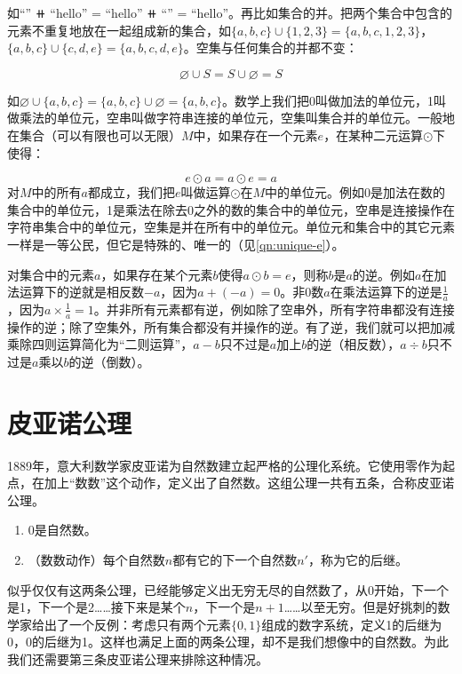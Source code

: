 \documentclass[b5paper]{ctexart}
\begin{document}
如``'' $\doubleplus$ ``hello'' = ``hello'' $\doubleplus$ ``'' = ``hello''。再比如集合的并。把两个集合中包含的元素不重复地放在一起组成新的集合，如$\{a, b, c\} \cup \{1, 2, 3\} = \{a, b, c, 1, 2, 3\}$，$\{a, b, c\} \cup \{c, d, e\} = \{a, b, c, d, e\}$。空集与任何集合的并都不变：

\[
\varnothing \cup S = S \cup \varnothing = S
\]

如$\varnothing \cup \{a, b, c\} = \{a, b, c\} \cup \varnothing = \{a, b, c\}$。数学上我们把0叫做加法的单位元，1叫做乘法的单位元，空串叫做字符串连接的单位元，空集叫集合并的单位元。一般地在集合（可以有限也可以无限）$M$中，如果存在一个元素$e$，在某种二元运算$\odot$下使得：

\[
  e \odot a = a \odot e = a
\]
对$M$中的所有$a$都成立，我们把$e$叫做运算$\odot$在$M$中的单位元。例如0是加法在数的集合中的单位元，1是乘法在除去0之外的数的集合中的单位元，空串是连接操作在字符串集合中的单位元，空集是并在所有中的单位元。单位元和集合中的其它元素一样是一等公民，但它是特殊的、唯一的（见\cref{qn:unique-e}）。

 
对集合中的元素$a$，如果存在某个元素$b$使得$a \odot b = e$，则称$b$是$a$的逆。例如$a$在加法运算下的逆就是相反数$-a$，因为$a + (-a) = 0$。非0数$a$在乘法运算下的逆是$\frac{1}{a}$，因为$a \times \frac{1}{a} = 1$。并非所有元素都有逆，例如除了空串外，所有字符串都没有连接操作的逆；除了空集外，所有集合都没有并操作的逆。有了逆，我们就可以把加减乘除四则运算简化为“二则运算”，$a - b$只不过是$a$加上$b$的逆（相反数），$a \div b$只不过是$a$乘以$b$的逆（倒数）。

\section{皮亚诺公理}
\label{sec:peano-axioms}
1889年，意大利数学家皮亚诺为自然数建立起严格的公理化系统。它使用零作为起点，在加上“数数”这个动作，定义出了自然数。这组公理一共有五条，合称皮亚诺公理。

\begin{enumerate}
\item 0是自然数。
\item （数数动作）每个自然数$n$都有它的下一个自然数$n'$，称为它的后继。
\end{enumerate}

似乎仅仅有这两条公理，已经能够定义出无穷无尽的自然数了，从0开始，下一个是1，下一个是2……接下来是某个$n$，下一个是$n+1$……以至无穷。但是好挑刺的数学家给出了一个反例：考虑只有两个元素$\{0, 1\}$组成的数字系统，定义1的后继为0，0的后继为1。这样也满足上面的两条公理，却不是我们想像中的自然数。为此我们还需要第三条皮亚诺公理来排除这种情况。
\end{document}
